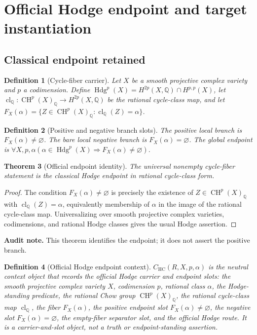 \documentclass[11pt]{article}
\newtheorem{theorem}{Theorem}[section]
\newtheorem{definition}[theorem]{Definition}
\newcommand{\QQ}{\mathbb{Q}}
\newcommand{\CH}{\operatorname{CH}}
\newcommand{\Hdg}{\operatorname{Hdg}}
\newcommand{\clQ}{\operatorname{cl}_{\QQ}}
\newcommand{\HC}{\operatorname{HC}}
\begin{document}
\section{Official Hodge endpoint and target instantiation}


\subsection{Classical endpoint retained}


\begin{definition}[Cycle-fiber carrier]
Let $X$ be a smooth projective complex variety and $p$ a codimension. Define $\Hdg^p(X)=H^{2p}(X,\QQ)\cap H^{p,p}(X)$, let $\clQ:\CH^p(X)_\QQ\to H^{2p}(X,\QQ)$ be the rational cycle-class map, and let $F_X(\alpha)=\{Z\in\CH^p(X)_\QQ:\clQ(Z)=\alpha\}$.
\end{definition}


\begin{definition}[Positive and negative branch slots]
The positive local branch is $F_X(\alpha)\neq\varnothing$. The bare local negative branch is $F_X(\alpha)=\varnothing$. The global endpoint is $\forall X,p,\alpha(\alpha\in\Hdg^p(X)\Rightarrow F_X(\alpha)\neq\varnothing)$.
\end{definition}


\begin{theorem}[Official endpoint identity]
The universal nonempty cycle-fiber statement is the classical Hodge endpoint in rational cycle-class form.
\end{theorem}
\begin{proof}
The condition $F_X(\alpha)\neq\varnothing$ is precisely the existence of $Z\in\CH^p(X)_\QQ$ with $\clQ(Z)=\alpha$, equivalently membership of $\alpha$ in the image of the rational cycle-class map. Universalizing over smooth projective complex varieties, codimensions, and rational Hodge classes gives the usual Hodge assertion.
\end{proof}
\par\noindent\textbf{Audit note.} This theorem identifies the endpoint; it does not assert the positive branch.


\begin{definition}[Official Hodge endpoint context]
$C_{\HC}(R,X,p,\alpha)$ is the neutral context object that records the official Hodge carrier and endpoint slots: the smooth projective complex variety $X$, codimension $p$, rational class $\alpha$, the Hodge-standing predicate, the rational Chow group $\CH^p(X)_\QQ$, the rational cycle-class map $\clQ$, the fiber $F_X(\alpha)$, the positive endpoint slot $F_X(\alpha)\neq\varnothing$, the negative slot $F_X(\alpha)=\varnothing$, the empty-fiber separator slot, and the official Hodge route.  It is a carrier-and-slot object, not a truth or endpoint-standing assertion.
\end{definition}
\end{document}
